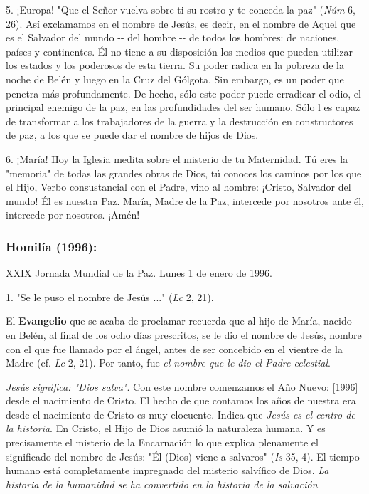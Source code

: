 \begin{body}
5. ¡Europa! "Que el Señor vuelva sobre ti su rostro y te conceda la paz"
(\emph{Núm} 6, 26). Así exclamamos en el nombre de Jesús, es decir, en
el nombre de Aquel que es el Salvador del mundo -\/- del hombre -\/- de
todos los hombres: de naciones, países y continentes. Él no tiene a su
disposición los medios que pueden utilizar los estados y los poderosos
de esta tierra. Su poder radica en la pobreza de la noche de Belén y
luego en la Cruz del Gólgota. Sin embargo, es un poder que penetra más
profundamente. De hecho, sólo este poder puede erradicar el odio, el
principal enemigo de la paz, en las profundidades del ser humano. Sólo l
es capaz de transformar a los trabajadores de la guerra y la destrucción
en constructores de paz, a los que se puede dar el nombre de hijos de
Dios.

6. ¡María! Hoy la Iglesia medita sobre el misterio de tu Maternidad. Tú
eres la "memoria" de todas las grandes obras de Dios, tú conoces los
caminos por los que el Hijo, Verbo consustancial con el Padre, vino al
hombre: ¡Cristo, Salvador del mundo! Él es nuestra Paz. María, Madre de
la Paz, intercede por nosotros ante él, intercede por nosotros. ¡Amén!

\subsubsection{Homilía (1996): }

XXIX Jornada Mundial de la Paz. Lunes 1 de enero de 1996.

1. "Se le puso el nombre de Jesús ..." (\emph{Lc} 2, 21).

El \textbf{Evangelio} que se acaba de proclamar recuerda que al hijo de María, nacido en Belén, al final de los ocho días prescritos, se le dio el nombre de Jesús, nombre con el que fue llamado por el ángel, antes de ser concebido en el vientre de la Madre (cf. \emph{Lc} 2, 21). Por tanto, fue \emph{el nombre que le dio el Padre celestial}.

\emph{Jesús significa: "Dios salva"}. Con este nombre comenzamos el Año Nuevo: {[}1996{]} desde el nacimiento de Cristo. El hecho de que contamos los años de nuestra era desde el nacimiento de Cristo es muy elocuente. Indica que \emph{Jesús es el centro de la historia}. En Cristo, el Hijo de Dios asumió la naturaleza humana. Y es precisamente el misterio de la Encarnación lo que explica plenamente el significado del nombre de Jesús: "Él (Dios) viene a salvaros" (\emph{Is} 35, 4). El tiempo humano está completamente impregnado del misterio salvífico de Dios. \emph{La historia de la humanidad se ha convertido en la historia de la salvación}.


\end{body}

